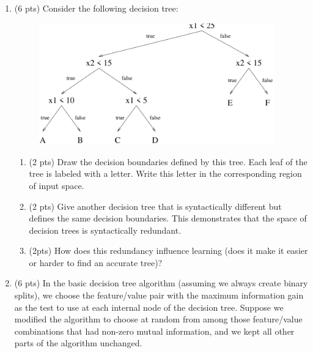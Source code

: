 \documentclass{article}
\def\centerps#1{\begin{center}
\leavevmode
\epsfbox{#1}
\end{center}}
\begin{document}
\begin{enumerate}
\begin{enumerate}
\end{enumerate}

\item (6 pts) Consider the following decision tree:\\
\begin{figure}[h]
\begin{center}
\includegraphics[width=4in]{tree1.pdf}
\end{center}
\end{figure}

\begin{enumerate} 
\item (2 pts) Draw the decision boundaries defined by this tree. Each
leaf of the tree is labeled with a letter.  Write this
letter in the corresponding region of input space.\\


\item (2 pts) Give another decision tree that is syntactically
different but defines the same decision boundaries.  This
demonstrates that the space of decision trees is
syntactically redundant.  \\


\item (2pts) How does this redundancy influence learning (does it make it easier or harder to find an accurate tree)?


\end{enumerate}
\item (6 pts) In the basic decision tree algorithm (assuming we always create binary splits), we choose the feature/value pair with the maximum information gain as the test to use at each internal node of the decision tree.  Suppose we modified the algorithm to choose at random from among those feature/value combinations that had non-zero mutual information, and we kept all other parts of the algorithm unchanged.


\end{enumerate}
\end{document}
